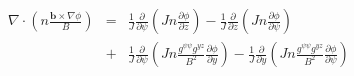 \documentclass[12pt]{article}
\begin{document}
\begin{eqnarray}
\nabla\cdot\left(n\frac{\mathbf{b}\times\nabla\phi}{B}\right) &=& \frac{1}{J}\frac{\partial}{\partial\psi}\left(Jn\frac{\partial\phi}{\partial z} \right) - \frac{1}{J}\frac{\partial}{\partial z}\left(Jn\frac{\partial\phi}{\partial\psi}\right)  \\
                                                              &+& \frac{1}{J}\frac{\partial}{\partial\psi}\left(Jn\frac{g^{\psi\psi}g^{yz}}{B^2}\frac{\partial\phi}{\partial y}\right) - \frac{1}{J}\frac{\partial}{\partial y}\left(Jn\frac{g^{\psi\psi}g^{yz}}{B^2}\frac{\partial\phi}{\partial\psi}\right)
\end{eqnarray}
\end{document}
